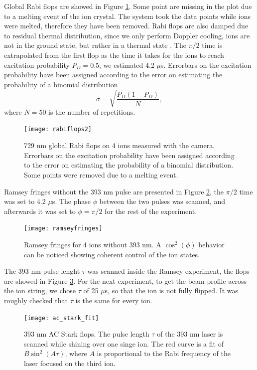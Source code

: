 Global Rabi flops are showed in Figure \ref{rabiflops4}. Some point are missing in the plot due to a melting event of the ion crystal. The system took the data points while ions were melted, therefore they have been removed. Rabi flops are also damped due to residual thermal distribution, since we only perform Doppler cooling, ions are not in the ground state, but rather in a thermal state \cite{ross}. The $\pi/2$ time is extrapolated from the first flop as the time it takes for the ions to reach excitation probability $P_D = 0.5$, we estimated 4.2 $\mu$s. Errorbars on the excitation probability have been assigned according to the error on estimating the probability of a binomial distribution \cite{mle}
\begin{equation}
\label{errorequation}
\sigma = \sqrt{\frac{P_{D}(1-P_{D})}{N}},
\end{equation}
where $N = 50$ is the number of repetitions.
\begin{figure}
\centering
\texttt{[image: rabiflops2]}
\caption{729 nm global Rabi flops on 4 ions measured with the camera. Errorbars on the excitation probability have been assigned according to the error on estimating the probability of a binomial distribution. Some points were removed due to a melting event.}
\label{rabiflops4}
\end{figure}
Ramsey fringes without the 393 nm pulse are presented in Figure \ref{ramseyfringes}, the $\pi/2$ time was set to 4.2 $\mu$s. The phase $\phi$ between the two pulses was scanned, and afterwards it was set to $\phi = \pi/2$ for the rest of the experiment.
\begin{figure}[H]
\centering
\texttt{[image: ramseyfringes]}
\caption{Ramsey fringes for 4 ions without 393 nm. A $\cos^2(\phi)$ behavior can be noticed showing coherent control of the ion states.}
\label{ramseyfringes}
\end{figure}
The 393 nm pulse lenght $\tau$ was scanned inside the Ramsey experiment, the flops are showed in Figure \ref{ACscan}. For the next experiment, to get the beam profile across the ion string, we chose $\tau$ of 25 $\mu$s, so that the ion is not fully flipped. It was roughly checked that $\tau$ is the same for every ion.
\begin{figure}[H]
\centering
\texttt{[image: ac\_stark\_fit]}
\caption{393 nm AC Stark flops. The pulse length $\tau$ of the 393 nm laser is scanned while shining over one singe ion. The red curve is a fit of $B\sin^2(A\tau)$, where $A$ is proportional to the Rabi frequency of the laser focused on the third ion.}
\label{ACscan}
\end{figure}
